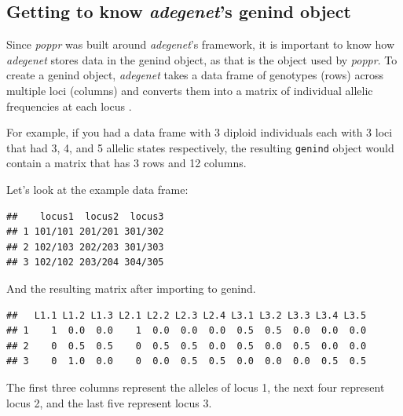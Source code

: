 \documentclass[letterpaper]{article}\usepackage[]{graphicx}\usepackage[]{color}
\makeatletter
\newenvironment{kframe}{%
 \def\at@end@of@kframe{}%
 \ifinner\ifhmode%
  \def\at@end@of@kframe{\end{minipage}}%
  \begin{minipage}{\columnwidth}%
 \fi\fi%
 \def\FrameCommand##1{\hskip\@totalleftmargin \hskip-\fboxsep
 \colorbox{shadecolor}{##1}\hskip-\fboxsep
     \hskip-\linewidth \hskip-\@totalleftmargin \hskip\columnwidth}%
 \MakeFramed {\advance\hsize-\width
   \@totalleftmargin\z@ \linewidth\hsize
   \@setminipage}}%
 {\par\unskip\endMakeFramed%
 \at@end@of@kframe}
\newenvironment{knitrout}{}{} %
\newcommand{\tab}{\hspace*{1em}}
\newcommand{\poppr}{\textit{poppr}}
\newcommand{\adegenet}{\textit{adegenet}}
\makeatother
\begin{document}
%
\subsection{Getting to know \adegenet{}'s genind object}
\label{intro:genind}

\tab\tab Since \poppr{} was built around \adegenet{}'s framework, it is
important to know how \adegenet{} stores data in the genind object, as
that is the object used by \poppr{}. To create a genind object, 
\adegenet{} takes a data frame of genotypes (rows) across multiple loci
(columns) and converts them into a matrix of individual allelic frequencies at
each locus \cite{Jombart:2008}.

For example, if you had a data frame with 3 diploid individuals each with 3 loci
that had 3, 4, and 5 allelic states respectively, the resulting \texttt{genind}
object would contain a matrix that has 3 rows and 12 columns. 

\noindent Let's look at the example data frame:
\begin{knitrout}\footnotesize
{}\color{fgcolor}\begin{kframe}
\begin{verbatim}
##    locus1  locus2  locus3
## 1 101/101 201/201 301/302
## 2 102/103 202/203 301/303
## 3 102/102 203/204 304/305
\end{verbatim}
\end{kframe}
\end{knitrout}

And the resulting matrix after importing to genind.
\begin{knitrout}\footnotesize
{}\color{fgcolor}\begin{kframe}
\begin{verbatim}
##   L1.1 L1.2 L1.3 L2.1 L2.2 L2.3 L2.4 L3.1 L3.2 L3.3 L3.4 L3.5
## 1    1  0.0  0.0    1  0.0  0.0  0.0  0.5  0.5  0.0  0.0  0.0
## 2    0  0.5  0.5    0  0.5  0.5  0.0  0.5  0.0  0.5  0.0  0.0
## 3    0  1.0  0.0    0  0.0  0.5  0.5  0.0  0.0  0.0  0.5  0.5
\end{verbatim}
\end{kframe}
\end{knitrout}

The first three columns represent the alleles of locus 1, the next four represent locus 2, and the last five represent locus 3.
\end{document}
